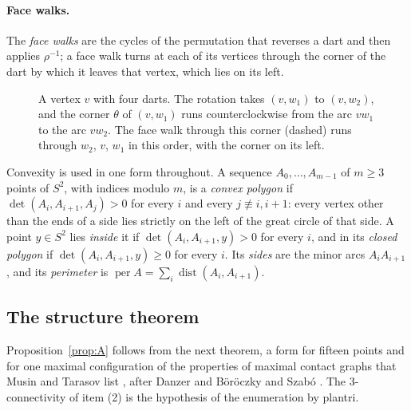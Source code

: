 \documentclass[12pt]{amsart}
\theoremstyle{definition}
\theoremstyle{plain}
\theoremstyle{definition}
\newcommand{\Sph}{S^2}
\newcommand{\dist}{\operatorname{dist}}
\newcommand{\per}{\operatorname{per}}
\begin{document}
\paragraph{Face walks.} The \emph{face walks} are the cycles of the permutation that reverses a dart and then applies $\rho^{-1}$; a face walk turns at each of its vertices through the corner of the dart by which it leaves that vertex, which lies on its left.

\begin{figure}[ht]
\centering
{}
\caption{A vertex $v$ with four darts. The rotation takes $(v,w_1)$ to $(v,w_2)$, and the corner $\theta$ of $(v,w_1)$ runs counterclockwise from the arc $vw_1$ to the arc $vw_2$. The face walk through this corner (dashed) runs through $w_2$, $v$, $w_1$ in this order, with the corner on its left.}\label{fig:corner}
\end{figure}

Convexity is used in one form throughout. A sequence $A_0,\dots,A_{m-1}$ of $m\ge3$ points of $\Sph$, with indices modulo $m$, is a \emph{convex polygon} if $\det(A_i,A_{i+1},A_j)>0$ for every $i$ and every $j\not\equiv i,i+1$: every vertex other than the ends of a side lies strictly on the left of the great circle of that side. A point $y\in\Sph$ lies \emph{inside} it if $\det(A_i,A_{i+1},y)>0$ for every $i$, and in its \emph{closed polygon} if $\det(A_i,A_{i+1},y)\ge0$ for every $i$. Its \emph{sides} are the minor arcs $A_iA_{i+1}$, and its \emph{perimeter} is $\per A=\sum_i\dist(A_i,A_{i+1})$.

\subsection{The structure theorem}
Proposition~\ref{prop:A} follows from the next theorem, a form for fifteen points and for one maximal configuration of the properties of maximal contact graphs that Musin and Tarasov list \cite[Propositions~3.1 and~3.2]{MT14}, after Danzer \cite{Dan} and B\"or\"oczky and Szab\'o \cite{BS13}. The 3-connectivity of item (2) is the hypothesis of the enumeration by plantri.
\end{document}
